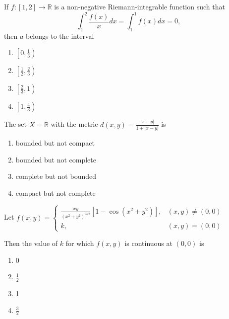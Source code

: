     \item If $f : [1, 2] \rightarrow \mathbb{R}$ is a non-negative Riemann-integrable function such that
    \[
    \int_1^2 \frac{f(x)}{x} dx = \int_1^1 f(x) dx = 0,
    \]
    then $a$ belongs to the interval

    \begin{multicols}{4}
    \begin{enumerate}
        \item $\left[0, \frac{1}{3}\right)$
        \item $\left[\frac{1}{2}, \frac{2}{3}\right)$
        \item $\left[\frac{2}{3}, 1\right)$
        \item $\left[1, \frac{4}{3}\right)$
    \end{enumerate}
    \end{multicols}
    \item The set $X = \mathbb{R}$ with the metric $d(x, y) = \frac{|x - y|}{1 + |x - y|}$ is
    \begin{multicols}{2}
    \begin{enumerate}
        \item bounded but not compact
        \item bounded but not complete
        \item complete but not bounded
        \item compact but not complete
    \end{enumerate}
    \end{multicols}

    \item Let $f(x, y) = 
    \begin{cases} 
        \frac{xy}{\left(x^2 + y^2\right)^{3/2}} \left[1 - \cos(x^2 + y^2)\right], & (x, y) \neq (0,0) \\ 
        k, & (x, y) = (0,0) 
    \end{cases}$

    Then the value of $k$ for which $f(x, y)$ is continuous at $(0,0)$ is
    \begin{multicols}{4}
    \begin{enumerate}
        \item 0
        \item $\frac{1}{2}$
        \item 1
        \item $\frac{3}{2}$
    \end{enumerate}
    \end{multicols}

